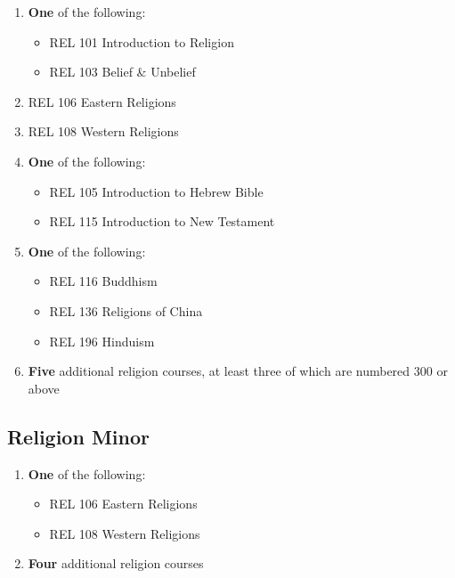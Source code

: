 \documentclass[
  letterpaper,
]{scrbook}
\providecommand{\tightlist}{%
  \setlength{\itemsep}{0pt}\setlength{\parskip}{0pt}}
\begin{document}
\begin{enumerate}
\def\labelenumi{\arabic{enumi}.}
\item
  \textbf{One} of the following:

  \begin{itemize}
  \tightlist
  \item
    REL 101 Introduction to Religion
  \item
    REL 103 Belief \& Unbelief
  \end{itemize}
\item
  REL 106 Eastern Religions
\item
  REL 108 Western Religions
\item
  \textbf{One} of the following:

  \begin{itemize}
  \tightlist
  \item
    REL 105 Introduction to Hebrew Bible
  \item
    REL 115 Introduction to New Testament
  \end{itemize}
\item
  \textbf{One} of the following:

  \begin{itemize}
  \tightlist
  \item
    REL 116 Buddhism
  \item
    REL 136 Religions of China
  \item
    REL 196 Hinduism
  \end{itemize}
\item
  \textbf{Five} additional religion courses, at least three of which are
  numbered 300 or above
\end{enumerate}

\subsection{Religion Minor}\label{religion-minor}

\begin{enumerate}
\def\labelenumi{\arabic{enumi}.}
\tightlist
\item
  \textbf{One} of the following:

  \begin{itemize}
  \tightlist
  \item
    REL 106 Eastern Religions
  \item
    REL 108 Western Religions
  \end{itemize}
\item
  \textbf{Four} additional religion courses
\end{enumerate}
\end{document}

